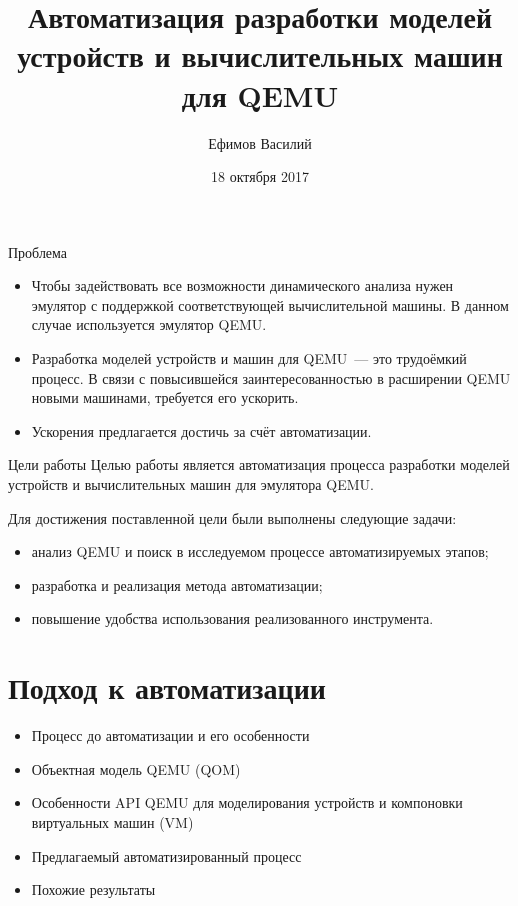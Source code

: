 \documentclass[unicode,hyperref={unicode=true}]{beamer}
\title[]
{Автоматизация разработки моделей устройств и вычислительных машин для QEMU}
\author[]{Ефимов Василий}
\institute[]{ИСП РАН}
\date[]{18 октября 2017}
\newcommand*{\sectionpagekb}{\usebeamertemplate*{section page kb}}
\theoremstyle{definition}
\theoremstyle{plain}
\begin{document}
\begin{frame}
\titlepage
\end{frame}



\begin{frame}{Проблема}
\begin{itemize}
\item Чтобы задействовать все возможности динамического анализа нужен эмулятор с
поддержкой соответствующей вычислительной машины.
В данном случае используется эмулятор QEMU.
\vfill
\item Разработка моделей устройств и машин для QEMU~--- это трудоёмкий процесс.
В связи с повысившейся заинтересованностью в расширении QEMU новыми
машинами, требуется его ускорить.
\vfill
\item Ускорения предлагается достичь за счёт автоматизации.
\end{itemize}
\end{frame}



\begin{frame}{Цели работы}
Целью работы является автоматизация процесса разработки моделей устройств и
вычислительных машин для эмулятора QEMU.

\vfill

{Для достижения поставленной цели были выполнены следующие задачи:}

\begin{itemize}
\item анализ QEMU и поиск в исследуемом процессе автоматизируемых этапов;
\item разработка и реализация метода автоматизации;
\item повышение удобства использования реализованного инструмента.
\end{itemize}
\end{frame}



\section{Подход к автоматизации}
\begin{frame}
\sectionpagekb
\begin{itemize}
\item Процесс до автоматизации и его особенности
\item Объектная модель QEMU (QOM)
\item Особенности API QEMU для моделирования устройств и компоновки виртуальных
машин (VM)
\item Предлагаемый автоматизированный процесс
\item Похожие результаты
\end{itemize}
\end{frame}
\end{document}
